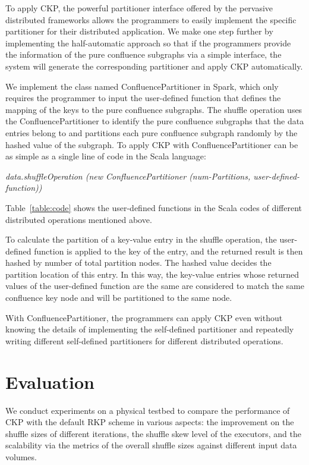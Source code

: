 \documentclass[10pt,journal,compsoc]{IEEEtran}
\begin{document}
To apply CKP, the powerful partitioner interface offered by the pervasive distributed frameworks allows the programmers to easily implement the specific partitioner for their distributed application. 
We make one step further by implementing the half-automatic approach so that if the programmers provide the information of the pure confluence subgraphs via a simple interface, the system will generate the corresponding partitioner 
and apply CKP automatically. 

We implement the class named ConfluencePartitioner in Spark, 
which only requires the programmer to input the user-defined function that defines the mapping of the keys to the pure confluence subgraphs. 
The shuffle operation uses the ConfluencePartitioner to identify the pure confluence subgraphs that the data entries belong to 
and partitions each pure confluence subgraph randomly by the hashed value of the subgraph.  
To apply CKP with ConfluencePartitioner can be as simple as a single line of code
in the Scala language:

\textit{data.shuffleOperation (new ConfluencePartitioner (num-Partitions, user-defined-function))}

Table~\ref{table:code} shows the user-defined functions in the Scala codes of different distributed operations mentioned above. 

To calculate the partition of a key-value entry in the shuffle operation, 
the user-defined function is applied to the key of the entry, 
and the returned result is then hashed by number of total partition nodes. 
The hashed value decides the partition location of this entry. 
In this way, the key-value entries whose returned values of the user-defined function are the same are considered to match the same confluence key node and will be partitioned to the same node.

With ConfluencePartitioner, the programmers can apply CKP even without knowing the details of implementing the self-defined partitioner and repeatedly writing different self-defined partitioners for different distributed operations.


\section{Evaluation}\label{section:evaluation}
We conduct experiments on a physical testbed to compare the performance of CKP with the default RKP scheme in various aspects: the improvement on the shuffle sizes of different iterations, the shuffle skew level of the executors, and the scalability via the metrics of the overall shuffle sizes against different input data volumes. 
\end{document}
